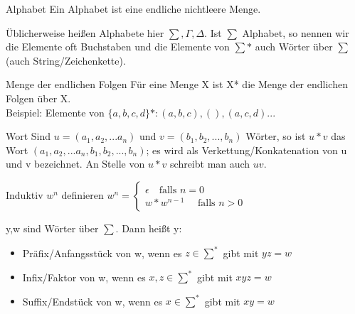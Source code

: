 \documentclass[avery5371]{flashcards}
\begin{document}

\begin{flashcard}[Definition]{Alphabet}
Ein Alphabet ist eine endliche nichtleere Menge.

Üblicherweise heißen Alphabete hier $\sum, \Gamma, \Delta$. Ist $\sum$ Alphabet, so nennen wir die Elemente oft Buchstaben und die Elemente von $\sum*$ auch Wörter über $\sum$ (auch String/Zeichenkette).
\end{flashcard}

\begin{flashcard}[Definition]{Menge der endlichen Folgen}
    Für eine Menge X ist X* die Menge der endlichen Folgen über X.\\

    Beispiel: Elemente von $\{a,b,c,d\}*:(a,b,c),(),(a,c,d)...$
\end{flashcard}

\begin{flashcard}[Definition]{Wort}
Sind $u=(a_1, a_2, ...a_n)$ und $v=(b_1, b_2,...,b_n)$ Wörter, so ist $u*v$ das Wort $(a_1,a_2,...a_n,b_1,b_2,...,b_n)$; es wird als Verkettung/Konkatenation von u und v bezeichnet.
An Stelle von $u*v$ schreibt man auch $uv$.
\end{flashcard}

\begin{flashcard}[Definition]{Induktiv $w^n$ definieren}
$w^n = \begin{cases} \epsilon \quad\text{falls } n=0 \\ {w * w^{n-1}} \quad\text{ falls } n>0 \end{cases}$
\end{flashcard}

\begin{flashcard}[Definition]{y,w sind Wörter über $\sum$. Dann heißt y:}
\begin{itemize}
    \item Präfix/Anfangsstück von w, wenn es $z\in\sum^*$ gibt mit $yz=w$
    \item Infix/Faktor von w, wenn es $x,z\in\sum^*$ gibt mit $xyz = w$
    \item Suffix/Endstück von w, wenn es $x\in\sum^*$ gibt mit $xy=w$
\end{itemize}    
\end{flashcard}
\end{document}

